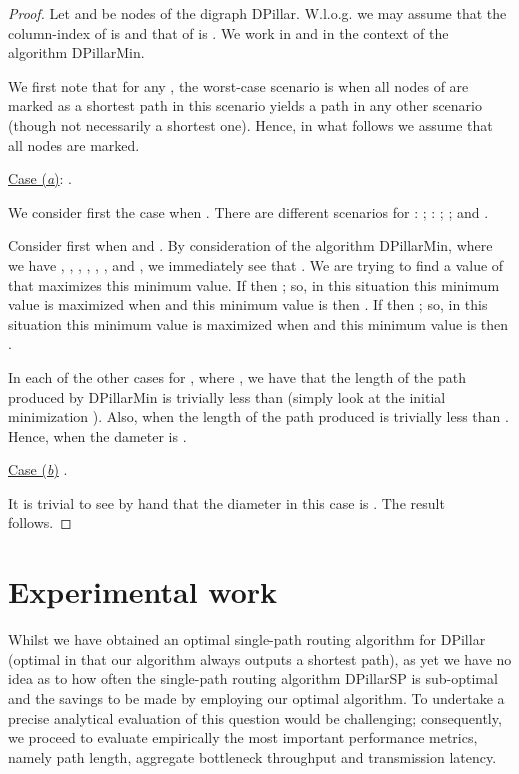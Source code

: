 \documentclass{article}
\begin{document}
\begin{proof}Let  and  be nodes of the digraph DPillar. W.l.o.g. we may assume that the column-index of  is  and that of  is . We work in  and in the context of the algorithm DPillarMin.

We first note that for any , the worst-case scenario is when all nodes of  are marked as a shortest path in this scenario yields a path in any other scenario (though not necessarily a shortest one). Hence, in what follows we assume that all nodes are marked.\medskip

\noindent\underline{Case (\emph{a\/})}: .\smallskip

\noindent We consider first the case when . There are  different scenarios for : ; : ; ; and .

Consider first when  and . By consideration of the algorithm DPillarMin, where we have , , , , , ,  and , we immediately see that . We are trying to find a value of  that maximizes this minimum value. If  then ; so, in this situation this minimum value is maximized when  and this minimum value is then . If  then ; so, in this situation this minimum value is maximized when  and this minimum value is then .

In each of the other  cases for , where , we have that the length of the path produced by DPillarMin is trivially less than  (simply look at the initial minimization ). Also, when  the length of the path produced is trivially less than  . Hence, when  the dameter is .\smallskip

\noindent\underline{Case (\emph{b\/})} .\smallskip

\noindent It is trivial to see by hand that the diameter in this case is . The result follows.
\end{proof}

\section{Experimental work}
Whilst we have obtained an optimal single-path routing algorithm for DPillar (optimal in that our algorithm always outputs a shortest path), as yet we have no idea as to how often the single-path routing algorithm DPillarSP is sub-optimal and the savings to be made by employing our optimal algorithm. To undertake a precise analytical evaluation of this question would be challenging; consequently, we proceed to evaluate empirically the most important performance metrics, namely path length, aggregate bottleneck throughput and transmission latency.
\end{document}
